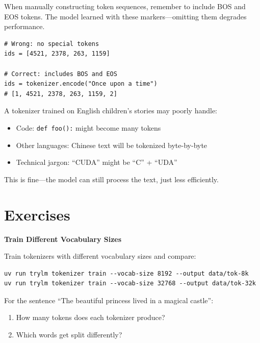 \begin{pitfall}[title=Forgetting Special Tokens]
When manually constructing token sequences, remember to include BOS and EOS tokens. The model learned with these markers---omitting them degrades performance.

\begin{lstlisting}[style=python]
# Wrong: no special tokens
ids = [4521, 2378, 263, 1159]

# Correct: includes BOS and EOS
ids = tokenizer.encode("Once upon a time")
# [1, 4521, 2378, 263, 1159, 2]
\end{lstlisting}
\end{pitfall}

\begin{pitfall}[title=Out-of-Distribution Text]
A tokenizer trained on English children's stories may poorly handle:
\begin{itemize}
    \item Code: \texttt{def foo():} might become many tokens
    \item Other languages: Chinese text will be tokenized byte-by-byte
    \item Technical jargon: ``CUDA'' might be ``C'' + ``UDA''
\end{itemize}
This is fine---the model can still process the text, just less efficiently.
\end{pitfall}

\section{Exercises}

\begin{exercise}
\textbf{Train Different Vocabulary Sizes}

Train tokenizers with different vocabulary sizes and compare:
\begin{lstlisting}[style=shell, numbers=none]
uv run trylm tokenizer train --vocab-size 8192 --output data/tok-8k
uv run trylm tokenizer train --vocab-size 32768 --output data/tok-32k
\end{lstlisting}

For the sentence ``The beautiful princess lived in a magical castle'':
\begin{enumerate}
    \item How many tokens does each tokenizer produce?
    \item Which words get split differently?
\end{enumerate}
\end{exercise}


